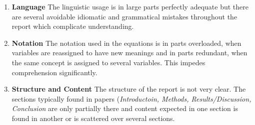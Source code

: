 \documentclass[../review.tex]{subfiles}
\begin{document}
 \textcolor{green}{\Large\checkmark}
\begin{enumerate}
 \item \textbf{Language} The linguistic usage is in large parts perfectly adequate but there are several avoidable idiomatic and grammatical mistakes throughout the report which complicate understanding.
 \item \textbf{Notation} The notation used in the equations is in parts overloaded, when variables are reassigned to have new meanings and in parts redundant, when the same concept is assigned to several variables. This impedes comprehension significantly.
 \item \textbf{Structure and Content} The structure of the report is not very clear. The sections typically found in papers (\textit{Introductoin, Methods, Results/Discussion, Conclusion} are only partially there and content expected in one section is found in another or is scattered over several sections.
\end{enumerate}
\end{document}
